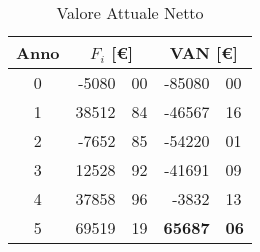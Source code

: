 \begin{table}[!h]
\centering
\begin{tabular}{c|r@{.}l|r@{.}l}
Anno
& \multicolumn{2}{|c}{$F_i$ [\euro]}
& \multicolumn{2}{|c}{VAN [\euro]}
\\          
\hline
0 & -5080&00 & -85080&00 \\
1 & 38512&84 & -46567&16 \\ 
2 & -7652&85 & -54220&01 \\
3 & 12528&92 & -41691&09 \\
4 & 37858&96 &  -3832&13 \\
5 & 69519&19 &  \textbf{65687}&\textbf{06} 
\end{tabular}
\caption{Valore Attuale Netto}
\label{tab:van}
\end{table}
